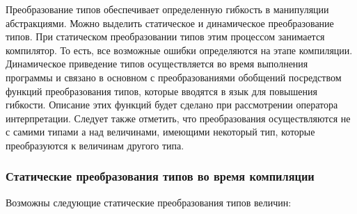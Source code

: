 {Преобразование типов обеспечивает определенную гибкость в манипуляции абстракциями. Можно выделить статическое и динамическое преобразование типов. При статическом преобразовании типов этим процессом занимается компилятор. То есть, все возможные ошибки определяются на этапе компиляции. Динамическое приведение типов осуществляется во время выполнения программы и связано в основном с преобразованиями обобщений посредством функций преобразования типов, которые вводятся в язык для повышения гибкости. Описание этих функций будет сделано при рассмотрении оператора интерпретации. Следует также отметить, что преобразования осуществляются не с самими типами а над величинами, имеющими некоторый тип, которые преобразуются к величинам другого типа.

\subsubsection{Статические преобразования типов во время компиляции}

Возможны следующие статические преобразования типов величин:

}
